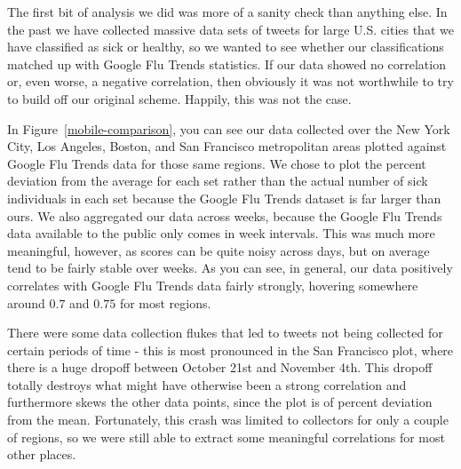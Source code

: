 \documentclass[11pt, letterpaper]{article}
\begin{document}
            The first bit of analysis we did was more of a sanity check than anything else. In the past we have collected massive data sets of tweets for large U.S. cities that we have classified as sick or healthy, so we wanted to see whether our classifications matched up with Google Flu Trends statistics. If our data showed no correlation or, even worse, a negative correlation, then obviously it was not worthwhile to try to build off our original scheme. Happily, this was not the case.

            In Figure~\ref{mobile-comparison}, you can see our data collected over the New York City, Los Angeles, Boston, and San Francisco metropolitan areas plotted against Google Flu Trends data for those same regions. We chose to plot the percent deviation from the average for each set rather than the actual number of sick individuals in each set because the Google Flu Trends dataset is far larger than ours. We also aggregated our data across weeks, because the Google Flu Trends data available to the public only comes in week intervals. This was much more meaningful, however, as scores can be quite noisy across days, but on average tend to be fairly stable over weeks. As you can see, in general, our data positively correlates with Google Flu Trends data fairly strongly, hovering somewhere around $0.7$ and $0.75$ for most regions.

            There were some data collection flukes that led to tweets not being collected for certain periods of time - this is most pronounced in the San Francisco plot, where there is a huge dropoff between October 21st and November 4th. This dropoff totally destroys what might have otherwise been a strong correlation and furthermore skews the other data points, since the plot is of percent deviation from the mean. Fortunately, this crash was limited to collectors for only a couple of regions, so we were still able to extract some meaningful correlations for most other places.
\end{document}
